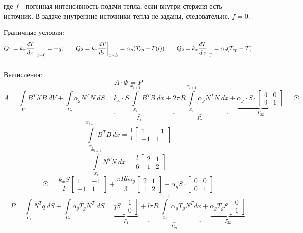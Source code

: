 \documentclass[a4paper, 12pt]{article}
\begin{document}
	где $f$ - погонная интенсивность подачи тепла, если внутри стержня есть источник. В задаче внутренние источники тепла не заданы, следовательно, $f=0$.
	
	Граничные условия:
	\[
	Q_1=k_x\frac{dT}{dx} \bigg{|}_{x=0} =-q; \qquad 	Q_2=k_x\frac{dT}{dx} \bigg{|}_{x=L} =\alpha_g(T_{cp}-T(l)) \qquad 	Q_2=k_x\frac{dT}{dx} \bigg{|}_{\Gamma} =\alpha_g(T_{cp}-T)
	\]\\


	Вычисления:
	\[
	A\cdot \Phi = P
	\]
	\[
	A=\int\limits_VB^TKB\ dV + \int\limits_{\Gamma_2} \alpha_g N^TN\ dS = \underbrace{k_x\cdot S \int\limits_{x_i}^{x_{i+1}} B^TB\ dx}_{\Gamma_1} + \underbrace{2\pi R \int\limits_{x_i}^{x_{i+1}} \alpha_g N^TN\ dx}_{\Gamma_{21}} +\underbrace{\alpha_g\cdot S \cdot \begin{bmatrix}
			0&0\\0&1
	\end{bmatrix}}_{\Gamma_{22}}=\astrosun
	\]
	\[
	\int\limits_{x_i}^{x_{i+1}} B^TB\ dx = \frac{1}{l}\begin{bmatrix}
		1&-1\\-1&1
	\end{bmatrix}
	\]
	\[
	\int\limits_{x_i}^{x_{i+1}} N^TN\ dx = \frac{l}{6}\begin{bmatrix}
		2&1\\1&2
	\end{bmatrix}
	\]
	\[
	\astrosun = \frac{k_x S}{l}\begin{bmatrix}
		1&-1\\-1&1
	\end{bmatrix}+\frac{\pi R l \alpha_g}{3}\begin{bmatrix}
	2&1\\1&2
	\end{bmatrix}+\alpha_gS \cdot \begin{bmatrix}
	0&0\\0&1
	\end{bmatrix}
	\]
	\[
	P=\int\limits_{\Gamma_1}N^T q\ dS +\int\limits_{\Gamma_2} \alpha_g T_g N^T \ dS = \underbrace{qS\begin{bmatrix}
			1\\0
	\end{bmatrix}}_{\Gamma_1}+\underbrace{l\pi R	\int\limits_{x_i}^{x_{i+1}} \alpha_g T_g N^T dx}_{\Gamma_{21}}+\underbrace{\alpha_g T_g S\begin{bmatrix}
	0\\1
\end{bmatrix}}_{\Gamma_{22}}
	\]
	
\end{document}
